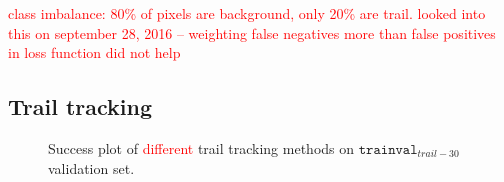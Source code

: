 \documentclass[letterpaper, 10 pt, conference]{ieeeconf}  %
\newcommand{\comment}[1]{\textcolor{red}{#1}}
\newcommand{\TrailAnnotatedSet}{\mathtt{trainval}_{trail}}
\newcommand{\TrailSeqAnnotatedSet}{\mathtt{trainval}_{trail-30}}
\begin{document}


\comment{class imbalance: 80\% of pixels are background, only 20\% are trail.  looked into this on september 28, 2016 -- weighting false negatives more than false positives in loss function did not help}



\subsection{Trail tracking}


\begin{figure}[!t]
\captionsetup[subfigure]{labelformat=empty}
\caption{Success plot of \comment{different} trail tracking methods on $\TrailSeqAnnotatedSet$ validation set.}
\label{fig:SP1_test}
\end{figure}
\end{document}
